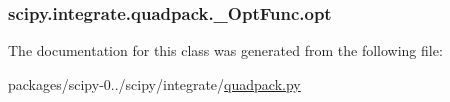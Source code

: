 \subsubsection[{opt}]{\setlength{\rightskip}{0pt plus 5cm}scipy.\+integrate.\+quadpack.\+\_\+\+Opt\+Func.\+opt}\label{classscipy_1_1integrate_1_1quadpack_1_1__OptFunc_ad2e17382d0a0df87e8abd56c4c5f706b}


The documentation for this class was generated from the following file\+:\begin{DoxyCompactItemize}
\item 
packages/scipy-\/0../scipy/integrate/\hyperlink{quadpack_8py}{quadpack.\+py}\end{DoxyCompactItemize}
